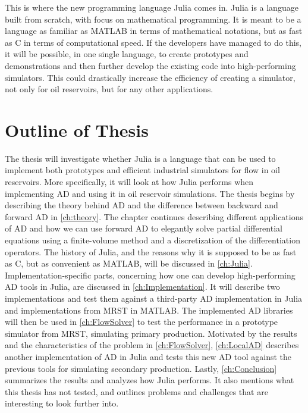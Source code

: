 This is where the new programming language Julia comes in. Julia is a language built from scratch, with focus on mathematical programming. It is meant to be a language as familiar as MATLAB in terms of mathematical notations, but as fast as C in terms of computational speed. If the developers have managed to do this, it will be possible, in one single language, to create prototypes and demonstrations and then further develop the existing code into high-performing simulators. This could drastically increase the efficiency of creating a simulator, not only for oil reservoirs, but for any other applications. 

\section{Outline of Thesis}
The thesis will investigate whether Julia is a language that can be used to implement both prototypes and efficient industrial simulators for flow in oil reservoirs. More specifically, it will look at how Julia performs when implementing AD and using it in oil reservoir simulations. The thesis begins by describing the theory behind AD and the difference between backward and forward AD in \autoref{ch:theory}. The chapter continues describing different applications of AD and how we can use forward AD to elegantly solve partial differential equations using a finite-volume method and a discretization of the differentiation operators. The history of Julia, and the reasons why it is supposed to be as fast as C, but as convenient as MATLAB, will be discussed in \autoref{ch:Julia}. Implementation-specific parts, concerning how one can develop high-performing AD tools in Julia, are discussed in \autoref{ch:Implementation}. It will describe two implementations and test them against a third-party AD implementation in Julia and implementations from MRST in MATLAB. The implemented AD libraries will then be used in \autoref{ch:FlowSolver} to test the performance in a prototype simulator from MRST, simulating primary production. Motivated by the results and the characteristics of the problem in \autoref{ch:FlowSolver}, \autoref{ch:LocalAD} describes another implementation of AD in Julia and tests this new AD tool against the previous tools for simulating secondary production. Lastly, \autoref{ch:Conclusion} summarizes the results and analyzes how Julia performs. It also mentions what this thesis has not tested, and outlines problems and challenges that are interesting to look further into.